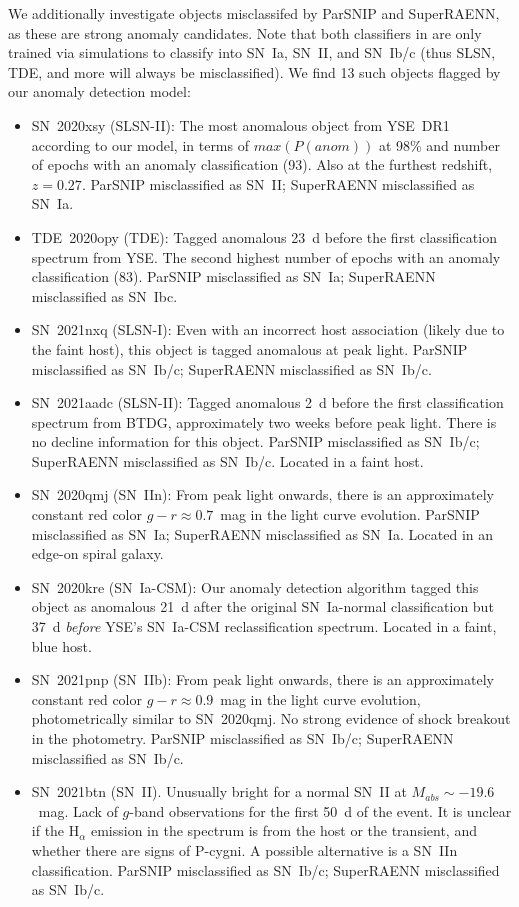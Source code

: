 \documentclass[twocolumn]{aastex63}
\begin{document}
We additionally investigate objects misclassifed by ParSNIP and SuperRAENN, as these are strong anomaly candidates. Note that both classifiers in \cite{Aleo2023} are only trained via simulations to classify into SN~Ia, SN~II, and SN~Ib/c (thus SLSN, TDE, and more will always be misclassified). We find 13 such objects flagged by our anomaly detection model: 
\begin{itemize}
    \item SN~2020xsy (SLSN-II): The most anomalous object from YSE~DR1 according to our model, in terms of $max(P(anom))$ at 98\% and number of epochs with an anomaly classification (93). Also at the furthest redshift, $z=0.27$. ParSNIP misclassified as SN~II; SuperRAENN misclassified as SN~Ia.
    \item TDE~2020opy (TDE): Tagged anomalous 23~d before the first classification spectrum from YSE. The second highest number of epochs with an anomaly classification (83). ParSNIP misclassified as SN~Ia; SuperRAENN misclassified as SN~Ibc.
    \item SN~2021nxq (SLSN-I): Even with an incorrect host association (likely due to the faint host), this object is tagged anomalous at peak light. ParSNIP misclassified as SN~Ib/c; SuperRAENN misclassified as SN~Ib/c. 
    \item SN~2021aadc (SLSN-II): Tagged anomalous 2~d before the first classification spectrum from BTDG, approximately two weeks before peak light. There is no decline information for this object. ParSNIP misclassified as SN~Ib/c; SuperRAENN misclassified as SN~Ib/c. Located in a faint host.
    \item SN~2020qmj (SN~IIn): From peak light onwards, there is an approximately constant red color $g-r\approx0.7$~mag in the light curve evolution. ParSNIP misclassified as SN~Ia; SuperRAENN misclassified as SN~Ia. Located in an edge-on spiral galaxy.
    \item SN~2020kre (SN~Ia-CSM): Our anomaly detection algorithm tagged this object as anomalous 21~d after the original SN~Ia-normal classification but 37~d \emph{before} YSE's SN~Ia-CSM reclassification spectrum. Located in a faint, blue host.
    \item SN~2021pnp (SN~IIb): From peak light onwards, there is an approximately constant red color $g-r\approx0.9$~mag in the light curve evolution, photometrically similar to SN~2020qmj. No strong evidence of shock breakout in the photometry. ParSNIP misclassified as SN~Ib/c; SuperRAENN misclassified as SN~Ib/c.
    \item SN~2021btn (SN~II). Unusually bright for a normal SN~II at $M_{abs}\sim-19.6$~mag. Lack of $g$-band observations for the first 50~d of the event. It is unclear if the H$_{\alpha}$ emission in the spectrum is from the host or the transient, and whether there are signs of P-cygni. A possible alternative is a SN~IIn classification. ParSNIP misclassified as SN~Ib/c; SuperRAENN misclassified as SN~Ib/c.

\end{itemize}
\end{document}
